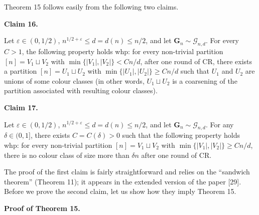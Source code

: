 


Theorem 15 follows easily from the following two claims.\par





\par\medskip\noindent\textbf{
Claim 16. 
}\par



Let $\varepsilon\in(0,1/2)$, $n^{1/2+\varepsilon}\leq d=d(n)\leq n/2$, and let $\mathbf{G}_{n}\sim\mathcal{G}_{n,d}$.
For every $C>1$, the following property holds whp: for every non-trivial partition $[n]=V_{1}\sqcup V_{2}$ with $\min\{|V_{1}|,|V_{2}|\}<Cn/d$, after one round of CR, there exists a partition $[n]=U_{1}\sqcup U_{2}$ with $\min\{|U_{1}|,|U_{2}|\}\geq Cn/d$ such that $U_{1}$ and $U_{2}$ are unions of some colour classes (in other words, $U_{1}\sqcup U_{2}$ is a coarsening of the partition
associated with resulting colour classes).\par







\par\medskip\noindent\textbf{
Claim 17. 
}\par



Let $\varepsilon\in(0,1/2)$, $n^{1/2+\varepsilon}\leq d=d(n)\leq n/2$, and let $\mathbf{G}_{n}\sim\mathcal{G}_{n,d}$.
For any $\delta\in(0,1]$, there exists $C=C(\delta)>0$ such that the following property holds whp: for every non-trivial partition $[n]=V_{1}\sqcup V_{2}$ with $\min\{|V_{1}|,|V_{2}|\}\geq Cn/d$, there is no colour class of size more than $\delta n$ after one round of CR.\par






The proof of the first claim is fairly straightforward and relies on the “sandwich theorem” (Theorem 11); it appears in the extended version of the paper [29]. Before we prove the second claim, let us show how they imply Theorem 15.\par




\par\medskip\noindent\textbf{Proof of Theorem 15.}\par




